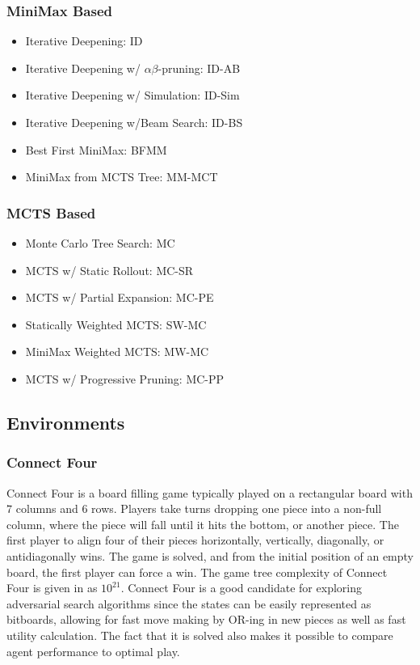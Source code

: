 \begin{multicols}{2}
    \subsubsection*{MiniMax Based}
    \begin{itemize}
        \item Iterative Deepening: ID
        \item Iterative Deepening w/ $\alpha\beta$-pruning: ID-AB
        \item Iterative Deepening w/ Simulation: ID-Sim
        \item Iterative Deepening w/Beam Search: ID-BS
        \item Best First MiniMax: BFMM
        \item MiniMax from MCTS Tree: MM-MCT
    \end{itemize}
    \columnbreak
    \subsubsection*{MCTS Based}
    \begin{itemize}
        \item Monte Carlo Tree Search: MC
        \item MCTS w/ Static Rollout: MC-SR
        \item MCTS w/ Partial Expansion: MC-PE
        \item Statically Weighted MCTS: SW-MC
        \item MiniMax Weighted MCTS: MW-MC
        \item MCTS w/ Progressive Pruning: MC-PP
    \end{itemize}
\end{multicols}

\newpage

\subsection{Environments}

\subsubsection{Connect Four}
Connect Four is a board filling game typically played on a rectangular board with $7$ columns and $6$ rows. Players take turns dropping one piece into a non-full column, where the piece will fall until it hits the bottom, or another piece. The first player to align four of their pieces horizontally, vertically, diagonally, or antidiagonally wins. The game is solved, and from the initial position of an empty board, the first player can force a win. The game tree complexity of Connect Four is given in \cite{Allis1994} as $10^{21}$. Connect Four is a good candidate for exploring adversarial search algorithms since the states can be easily represented as bitboards, allowing for fast move making by OR-ing in new pieces as well as fast utility calculation. The fact that it is solved also makes it possible to compare agent performance to optimal play.

